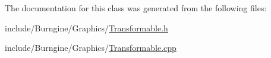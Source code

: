 The documentation for this class was generated from the following files\-:\begin{DoxyCompactItemize}
\item 
include/\-Burngine/\-Graphics/\hyperlink{_transformable_8h}{Transformable.\-h}\item 
include/\-Burngine/\-Graphics/\hyperlink{_transformable_8cpp}{Transformable.\-cpp}\end{DoxyCompactItemize}
